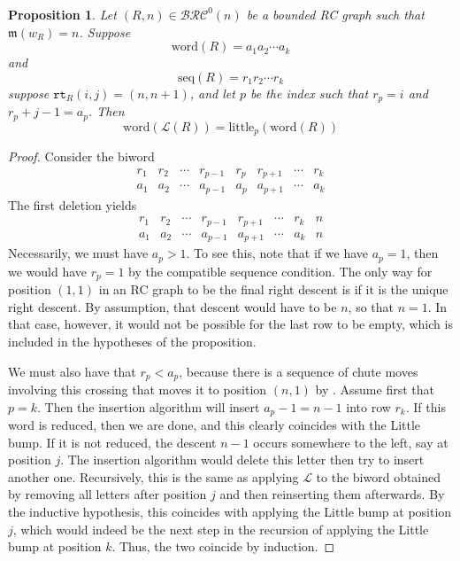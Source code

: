 \documentclass[a4paper,fleqn]{cas-sc}
\newtheorem{proposition}[lemma]{Proposition}
\theoremstyle{definition}
\theoremstyle{remark}
\numberwithin{equation}{subsection}
\newcommand{\wof}[1]{w_{#1}}
\newcommand{\rtt}{\mathtt{rt}}
\newcommand{\BRC}{\mathcal{BRC}}
\newcommand{\lmap}{\mathscr{L}}
\newcommand{\ltb}{\mathrm{little}}
\newcommand{\maxd}{\mathfrak{m}}
\begin{document}
\begin{proposition} \label{proposition:little_bump}
  Let $(R, n)\in \BRC^0(n)$ be a bounded RC graph such that $\maxd(\wof{R}) = n$. Suppose 
  $$\mathrm{word}(R) = a_1 a_2 \cdots a_k$$ 
  and 
  $$\mathrm{seq}(R) = r_1 r_2 \cdots r_k$$ 
  suppose $\rtt_R(i,j)=(n,n+1)$, and let $p$ be the index such that $r_p=i$ and $r_p + j - 1 = a_p$. Then
  $$\mathrm{word}(\lmap(R)) = \ltb_{p}(\mathrm{word}(R))$$
\end{proposition}
\begin{proof}
Consider the biword
$$\begin{matrix}
r_1& r_2& \cdots & r_{p-1} & r_p & r_{p+1} & \cdots & r_k\\
a_1& a_2& \cdots & a_{p-1} & a_p & a_{p+1} & \cdots & a_k
\end{matrix}$$
The first deletion yields
$$\begin{matrix}
r_1& r_2& \cdots & r_{p-1} &  r_{p+1} & \cdots & r_k& n\\
a_1& a_2& \cdots & a_{p-1} &  a_{p+1} & \cdots & a_k& n
\end{matrix}$$
Necessarily, we must have $a_p > 1$. To see this, note that if we have $a_p=1$, then we would have $r_p=1$ by the compatible sequence condition. The only way for position $(1,1)$ in an RC graph to be the final right descent is if it is the unique right descent. By assumption, that descent would have to be $n$, so that $n=1$. In that case, however, it would not be possible for the last row to be empty, which is included in the hypotheses of the proposition.

We must also have that $r_p < a_p$, because there is a sequence of chute moves involving this crossing that moves it to position $(n, 1)$ by \cite[Theorem~3.7]{bbrc}. Assume first that $p = k$. Then the insertion algorithm will insert $a_p - 1=n-1$ into row $r_k$. If this word is reduced, then we are done, and this clearly coincides with the Little bump. If it is not reduced, the descent $n-1$ occurs somewhere to the left, say at position $j$. The insertion algorithm would delete this letter then try to insert another one. Recursively, this is the same as applying $\lmap$ to the biword obtained by removing all letters after position $j$ and then reinserting them afterwards. By the inductive hypothesis, this coincides with applying the Little bump at position $j$, which would indeed be the next step in the recursion of applying the Little bump at position $k$. Thus, the two coincide by induction.
\end{proof}
\end{document}
